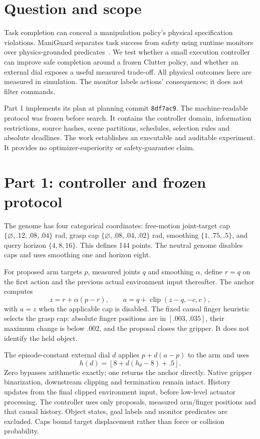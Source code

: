 \documentclass[sigconf,dvipsnames]{acmart}
\begin{document}
\section{Question and scope}
Task completion can conceal a manipulation policy's physical specification
violations. ManiGuard separates task success from safety using runtime monitors
over physics-grounded predicates~\cite{maniguard}. We test whether a small execution
controller can improve safe completion around a frozen Clutter policy, and whether
an external dial exposes a useful measured trade-off. All physical outcomes here
are measured in simulation. The monitor labels actions' consequences; it does not
filter commands.

Part 1 implements its plan at planning commit \texttt{8df7ac9}. The
machine-readable protocol was frozen before search. It contains the controller
domain, information restrictions, source hashes, scene partitions, schedules,
selection rules and absolute deadlines. The work establishes an executable and
auditable experiment. It provides no optimizer-superiority or safety-guarantee claim.

\section{Part 1: controller and frozen protocol}
The genome has four categorical coordinates: free-motion joint-target cap
$\{\varnothing,.12,.08,.04\}$ rad, grasp cap
$\{\varnothing,.08,.04,.02\}$ rad, smoothing $\{1,.75,.5\}$, and query horizon
$\{4,8,16\}$. This defines 144 points. The neutral genome disables caps and uses
smoothing one and horizon eight.

For proposed arm targets $p$, measured joints $q$ and smoothing $\alpha$, define
$r=q$ on the first action and the previous actual environment input thereafter.
The anchor computes
\begin{equation}
 z=r+\alpha(p-r),\qquad
 a=q+\operatorname{clip}(z-q,-c,c),
\end{equation}
with $a=z$ when the applicable cap is disabled. The fixed causal finger heuristic
selects the grasp cap: absolute finger positions are in $[.003,.035]$, their
maximum change is below $.002$, and the proposal closes the gripper. It does not
identify the held object.

The episode-constant external dial $d$ applies $p+d(a-p)$ to the arm and uses
\begin{equation}
 h(d)=\left\lfloor8+d(h_\theta-8)+.5\right\rfloor.
\end{equation}
Zero bypasses arithmetic exactly; one returns the anchor directly. Native gripper
binarization, downstream clipping and termination remain intact. History updates
from the final clipped environment input, before low-level actuator processing.
The controller uses only proposals, measured arm/finger positions and that causal
history. Object states, goal labels and monitor predicates are excluded. Caps
bound target displacement rather than force or collision probability.
\end{document}
